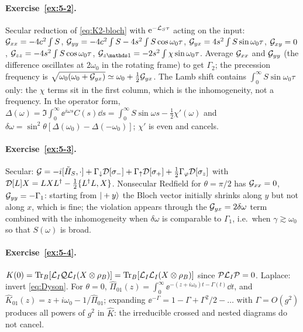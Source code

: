 \paragraph{Exercise~\ref{ex:5-2}.}
Secular reduction of \cref{eq:K2-bloch} with $\mathrm{e}^{-\mathcal{L}_S\tau}$ acting on the input: $\mathcal{G}_{xx}=-4c^2\int S$, $\mathcal{G}_{yy}=-4c^2\int S-4s^2\int S\cos\omega_0\tau$, $\mathcal{G}_{yx}=4s^2\int S\sin\omega_0\tau$, $\mathcal{G}_{xy}=0$, $\mathcal{G}_{zz}=-4s^2\int S\cos\omega_0\tau$, $\Gc_{z\Id}=-2s^2\int\chi\sin\omega_0\tau$.
Average $\mathcal{G}_{xx}$ and $\mathcal{G}_{yy}$ (the difference oscillates at $2\omega_0$ in the rotating frame) to get $\Gamma_2$; the precession frequency is $\sqrt{\omega_0(\omega_0+\mathcal{G}_{yx})}\simeq\omega_0+\tfrac12\mathcal{G}_{yx}$.
The Lamb shift contains $\int_0^\infty S\sin\omega_0\tau$ only: the $\chi$ terms sit in the first column, which is the inhomogeneity, not a frequency.
In the operator form, $\Delta(\omega)=\Im\int_0^\infty\ee^{i\omega s}C(s)\dd s=\int_0^\infty S\sin\omega s-\tfrac12\chi'(\omega)$ and $\delta\omega=\sin^2\theta[\Delta(\omega_0)-\Delta(-\omega_0)]$; $\chi'$ is even and cancels.

\paragraph{Exercise~\ref{ex:5-3}.}
Secular: $\mathcal{G}=-i[\tilde H_S,\cdot]+\Gamma_\downarrow\mathcal{D}[\sigma_-]+\Gamma_\uparrow\mathcal{D}[\sigma_+]+\tfrac12\Gamma_\varphi\mathcal{D}[\sigma_z]$ with $\mathcal{D}[L]X=LXL^\dagger-\tfrac12\{L^\dagger L,X\}$.
Nonsecular Redfield for $\theta=\pi/2$ has $\mathcal{G}_{xx}=0$, $\mathcal{G}_{yy}=-\Gamma_1$: starting from $|+y\rangle$ the Bloch vector initially shrinks along $y$ but not along $x$, which is fine; the violation appears through the $\mathcal{G}_{yx}=2\delta\omega$ term combined with the inhomogeneity when $\delta\omega$ is comparable to $\Gamma_1$, i.e.\ when $\gamma\gtrsim\omega_0$ so that $S(\omega)$ is broad.

\paragraph{Exercise~\ref{ex:5-4}.}
$K(0)=\operatorname{Tr}_B[\mathcal{L}_I\mathcal{Q}\mathcal{L}_I(X\otimes\rho_{B})]=\operatorname{Tr}_B[\mathcal{L}_I\mathcal{L}_I(X\otimes\rho_{B})]$ since $\mathcal{P}\mathcal{L}_I\mathcal{P}=0$.
Laplace: invert \cref{eq:Dyson}.
For $\theta=0$, $\hat\Pi_{01}(z)=\int_0^\infty\ee^{-(z+i\omega_0)t-\Gamma(t)}\dd t$, and $\hat K_{01}(z)=z+i\omega_0-1/\hat\Pi_{01}$; expanding $\ee^{-\Gamma}=1-\Gamma+\Gamma^2/2-\dots$ with $\Gamma=O(g^2)$ produces all powers of $g^2$ in $\hat K$: the irreducible crossed and nested diagrams do not cancel.

